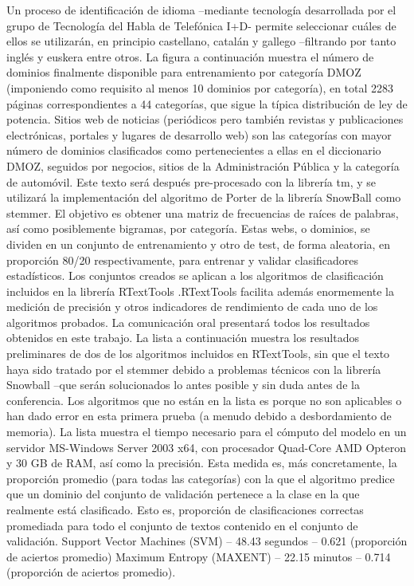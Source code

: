 Un proceso de identificación de idioma –mediante tecnología desarrollada por el grupo de Tecnología del Habla de Telefónica I+D- permite seleccionar cuáles de ellos se utilizarán, en principio castellano, catalán y gallego –filtrando por tanto inglés y euskera entre otros. La figura a continuación muestra el número de dominios finalmente disponible para entrenamiento por categoría DMOZ (imponiendo como requisito al menos 10 dominios por categoría), en total 2283 páginas correspondientes a 44 categorías, que sigue la típica  distribución de ley de potencia. Sitios web de noticias (periódicos pero también revistas y publicaciones electrónicas, portales y lugares de desarrollo web) son las categorías con mayor  número de dominios clasificados como pertenecientes a ellas en el diccionario DMOZ, seguidos por negocios, sitios de la Administración Pública y la categoría de automóvil.
Este texto será después pre-procesado con la librería tm, y se utilizará la implementación del algoritmo de Porter de la librería SnowBall como stemmer. El objetivo es obtener una matriz de frecuencias de raíces de palabras, así como posiblemente bigramas, por categoría.
Estas webs, o dominios, se dividen en un conjunto de entrenamiento y otro de test, de forma aleatoria, en proporción 80/20 respectivamente, para entrenar y validar clasificadores estadísticos.
Los conjuntos creados se aplican a los algoritmos de clasificación incluidos en la librería RTextTools .RTextTools facilita además enormemente la medición de precisión y otros indicadores de rendimiento de cada uno de los algoritmos probados. La comunicación oral presentará todos los resultados obtenidos en este trabajo. 
La lista a continuación muestra los resultados preliminares de dos de los algoritmos incluidos en RTextTools, sin que el texto haya sido tratado por el stemmer debido a problemas técnicos con la librería Snowball –que serán solucionados lo antes posible y sin duda antes de la conferencia. 
Los algoritmos que no están en la lista es porque no son aplicables o han dado error en esta primera prueba (a menudo debido a desbordamiento de memoria). La lista muestra el tiempo necesario para el cómputo del modelo en un servidor MS-Windows Server 2003 x64, con procesador Quad-Core AMD Opteron y 30 GB de RAM, así como la precisión. Esta medida es, más concretamente, la proporción promedio (para todas las categorías) con la que el algoritmo predice que un dominio del conjunto de validación pertenece a la clase en la que realmente está clasificado. Esto es, proporción de clasificaciones correctas promediada para todo el conjunto de textos contenido en el conjunto de validación. 
Support Vector Machines (SVM) – 48.43 segundos – 0.621 (proporción de aciertos promedio)
Maximum Entropy (MAXENT) – 22.15 minutos – 0.714 (proporción de aciertos promedio).

%

%
